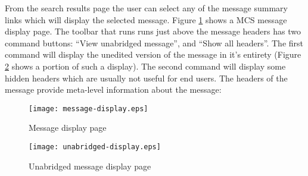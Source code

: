 From the search results page the user can select any of the message summary
links which will display the selected message. Figure \ref{fig:message-display}
shows a MCS message display page. The toolbar that runs runs just above the
message headers has two command buttons: ``View unabridged message'', and
``Show all headers''. The first command will display the unedited version of
the message in it's entirety (Figure \ref{fig:unabridged-display} shows a
portion of such a display). The second command will display some hidden headers
which are usually not useful for end users. The headers of the message provide
meta-level information about the message:

\begin{figure}[htbp]
  \centering
  \texttt{[image: message-display.eps]}
  \caption{Message display page}
  \label{fig:message-display}
\end{figure}

\begin{figure}[htbp]
  \centering
  \texttt{[image: unabridged-display.eps]}
  \caption{Unabridged message display page}
  \label{fig:unabridged-display}
\end{figure}

